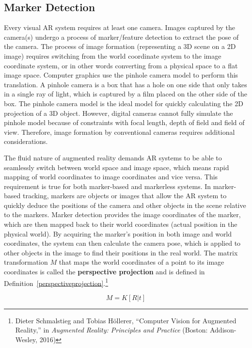 \subsection{Marker Detection}
Every visual AR system requires at least one camera. Images captured by the camera(s) undergo a process of marker/feature detection to extract the pose of the camera. The process of image formation (representing a 3D scene on a 2D image) requires switching from the world coordinate system to the image coordinate system, or in other words converting from a physical space to a flat image space. Computer graphics use the pinhole camera model to perform this translation. A pinhole camera is a box that has a hole on one side that only takes in a single ray of light, which is captured by a film placed on the other side of the box. The pinhole camera model is the ideal model for quickly calculating the 2D projection of a 3D object. However, digital cameras cannot fully simulate the pinhole model because of constraints with focal length, depth of field and field of view. Therefore, image formation by conventional cameras requires additional considerations.

The fluid nature of augmented reality demands AR systems to be able to seamlessly switch between world space and image space, which means rapid mapping of world coordinates to image coordinates and vice versa. This requirement is true for both marker-based and markerless systems. In marker-based tracking, markers are objects or images that allow the AR system to quickly deduce the positions of the camera and other objects in the scene relative to the markers. Marker detection provides the image coordinates of the marker, which are then mapped back to their world coordinates (actual position in the physical world). By acquiring the marker’s position in both image and world coordinates, the system can then calculate the camera pose, which is applied to other objects in the image to find their positions in the real world. The matrix transformation $M$ that maps the world coordinates of a point to its image coordinates is called the \textbf{perspective projection} and is defined in Definition~\ref{perspectiveprojection}.\footnote{Dieter Schmalstieg and Tobias Höllerer, “Computer Vision for Augmented Reality,” in \textit{Augmented Reality: Principles and Practice} (Boston: Addison-Wesley, 2016)}

\begin{equation}[Perspective projection]\label{perspectiveprojection}
M = K [R | t]
\end{equation}

